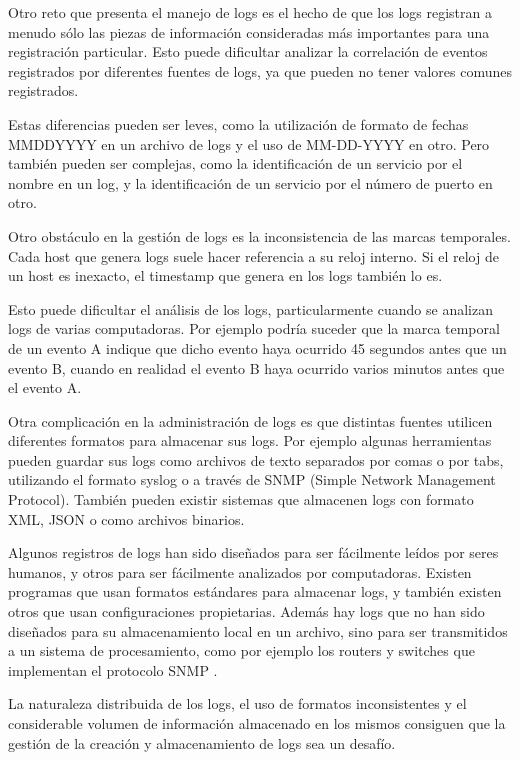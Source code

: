 Otro reto que presenta el manejo de logs es el hecho de que los logs registran a menudo sólo las piezas de información consideradas más importantes para una registración particular. Esto puede dificultar analizar la correlación de eventos registrados por diferentes fuentes de logs, ya que pueden no tener valores comunes registrados.

Estas diferencias pueden ser leves, como la utilización de formato de fechas MMDDYYYY en un archivo de logs y el uso de MM-DD-YYYY en otro. Pero también pueden ser complejas, como la identificación de un servicio por el nombre en un log, y la identificación de un servicio por el número de puerto en otro.

Otro obstáculo en la gestión de logs es la inconsistencia de las marcas temporales. Cada host que genera logs suele hacer referencia a su reloj interno. Si el reloj de un host es inexacto, el timestamp que genera en los logs también lo es.

Esto puede dificultar el análisis de los logs, particularmente cuando se analizan logs de varias computadoras. Por ejemplo podría suceder que la marca temporal de un evento A indique que dicho evento haya ocurrido 45 segundos antes que un evento B, cuando en realidad el evento B haya ocurrido varios minutos antes que el evento A.

Otra complicación en la administración de logs es que distintas fuentes utilicen diferentes formatos para almacenar sus logs. Por ejemplo algunas herramientas pueden guardar sus logs como archivos de texto separados por comas o por tabs, utilizando el formato syslog o a través de SNMP (Simple Network Management Protocol). También pueden existir sistemas que almacenen logs con formato XML, JSON o como archivos binarios.

Algunos registros de logs han sido diseñados para ser fácilmente leídos por seres humanos, y otros para ser fácilmente analizados por computadoras. Existen programas que usan formatos estándares para almacenar logs, y también existen otros que usan configuraciones propietarias. Además hay logs que no han sido diseñados para su almacenamiento local en un archivo, sino para ser transmitidos a un sistema de procesamiento, como por ejemplo los routers y switches que implementan el protocolo SNMP \cite[p.~23]{monitoreo:log_management_guide}.

La naturaleza distribuida de los logs, el uso de formatos inconsistentes y el considerable volumen de información almacenado en los mismos consiguen que la gestión de la creación y almacenamiento de logs sea un desafío.

